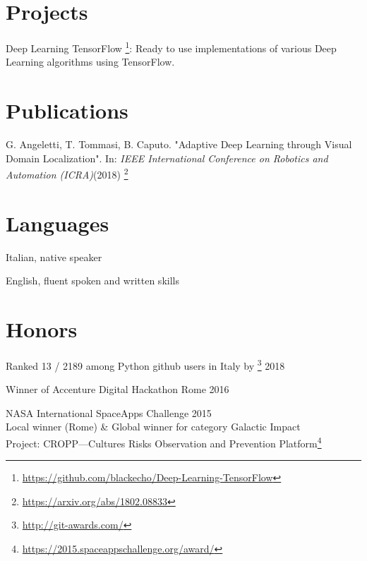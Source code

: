 \documentclass[margin]{res}
\begin{document}
\begin{resume}
        \section{Projects}
        \begin{description}
            \item Deep Learning TensorFlow \footnote{\url{https://github.com/blackecho/Deep-Learning-TensorFlow}}:
                Ready to use implementations of various Deep Learning algorithms using TensorFlow.
        \end{description}

        \section{Publications}
        \begin{description}
            \item G. Angeletti, T. Tommasi, B. Caputo.
                "Adaptive Deep Learning through Visual Domain Localization".
                In: \textit{IEEE International Conference on Robotics and Automation (ICRA)}(2018) \footnote{\url{https://arxiv.org/abs/1802.08833}}
        \end{description}

        \section{Languages}
        \begin{description}
            \item Italian, native speaker
            \item English, fluent spoken and written skills
        \end{description}

        \section{Honors}
        \begin{description}
            \item Ranked 13 / 2189 among Python github users in Italy by \footnote{\url{http://git-awards.com/}} \hfill 2018
            \item Winner of Accenture Digital Hackathon Rome \hfill 2016
            \item NASA International SpaceApps Challenge \hfill 2015\\
                Local winner (Rome) \& Global winner for category Galactic Impact\\
                Project: CROPP---Cultures Risks Observation and Prevention
                Platform\footnote{\url{https://2015.spaceappschallenge.org/award/}}
        \end{description}


\end{resume}
\end{document}
